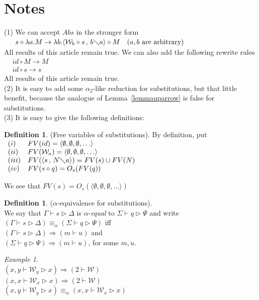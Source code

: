 \documentclass[11pt]{amsart}
\theoremstyle{plain}
\theoremstyle{definition}
\newtheorem{definition}[theorem]{Definition}
\theoremstyle{remark}
\newtheorem{example}[theorem]{Example}
\numberwithin{equation}{section}
\newcommand{\tri}{\triangleright}
\newcommand{\ci}{\circ}
\newcommand{\mi}{\,,\,}
\newcommand{\is}{\diagdown}
\newcommand{\arrow}{\rightarrow}
\newcommand{\la}{\langle}
\newcommand{\ra}{\rangle}
\newcommand{\alp}{\equiv_{\alpha}}
\newcommand{\x}{a}
\newcommand{\y}{b}
\renewcommand{\pi}{\mathcal{W}}
\begin{document}
\section{Notes}
(1) We can accept $Abs$ in the stronger form\\
$\begin{array}{lll}  & s\ci\lambda \x.M\arrow\lambda
\y.\la\pi_{\y}\ci s\mi \y\is \x\ra\ci M & (\x,\y \text{ are
arbitrary})
\end{array}$\\[5pt]
All results of this article remain true.
We can also add the following rewrite rules\\
$\begin{array}{ll} & id\ci M\arrow M\\
& id\ci s\arrow s
\end{array}$\\[5pt]
All results of this article remain true.\\

(2) It is easy to add some $\alpha_2$-like reduction for
substitutions, but that little benefit, because the analogue of
Lemma~\ref{lemmauparrow} is false for substitutions.\\

(3) It is easy to give the following definitions:
\begin{definition}(Free variables of substitutions). By definition, put\label{FV}\\
$
\begin{array}{ll}
(i) & FV(id)=\langle \emptyset,\emptyset,\emptyset,\ldots\rangle\\
(ii) & FV(\pi_{\x})=\langle \emptyset,\emptyset,\emptyset,\ldots\rangle\\
(iii) & FV(\la s\mi N\is \x\ra)=FV(s)\cup FV(N)\\
 (iv) & FV(s\ci q)=O_s(FV(q))
\end{array}
$
\end{definition}
We see that $FV(s)=O_s(\langle
\emptyset,\emptyset,\emptyset,\ldots\rangle)$

\begin{definition}($\alpha$-equivalence for substitutions).\\
 We say that $\Gamma\vdash s\tri\Delta$ is $\alpha$-\emph{equal} to $\Sigma\vdash
q\tri\Psi$ and write\\ $(\Gamma\vdash
s\tri\Delta)\alp(\Sigma\vdash
q\tri\Psi)$ iff\\
$(\Gamma\vdash s\tri\Delta)\Rightarrow (m\vdash u)$ and\\
$(\Sigma\vdash q\tri\Psi)\Rightarrow (m\vdash u)$, for some $m,u$.
\end{definition}
\begin{example}$ $\\
$(x,y\vdash\pi_y\tri x)\Rightarrow(2\vdash \pi)$\\
$(x,x\vdash\pi_x\tri x)\Rightarrow(2\vdash\pi)$\\
$(x,y\vdash\pi_y\tri x)\alp (x,x\vdash \pi_x\tri x)$
\end{example}
\end{document}
